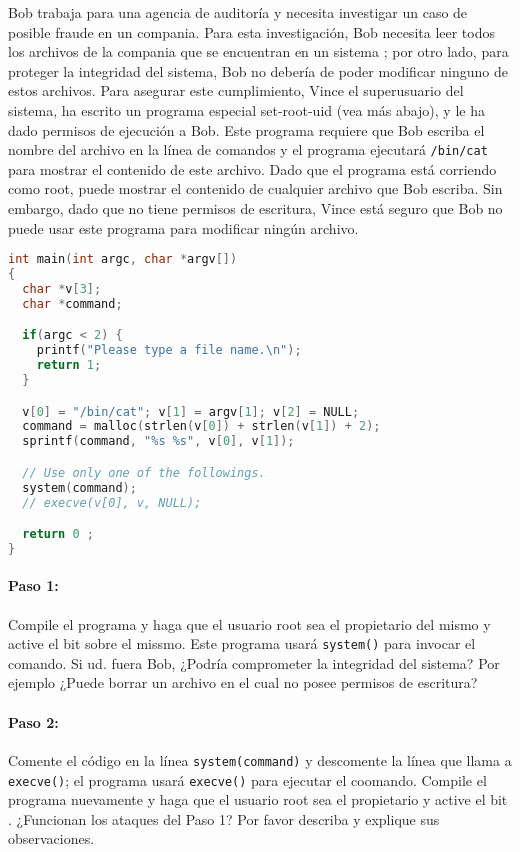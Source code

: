 Bob trabaja para una agencia de auditoría y necesita investigar un caso de posible fraude en un compania. Para esta investigación, Bob necesita leer todos los archivos de la compania que se encuentran en un sistema \unix; por otro lado, para proteger la integridad del sistema, Bob no debería de poder modificar ninguno de estos archivos.
Para asegurar este cumplimiento, Vince el superusuario del sistema, ha escrito un programa especial set-root-uid (vea más abajo), y le ha dado permisos de ejecución a Bob. Este programa requiere que Bob escriba el nombre del archivo en la línea de comandos y el programa ejecutará {\tt /bin/cat} para mostrar el contenido de este archivo. Dado que el programa está corriendo como root, puede mostrar el contenido de cualquier archivo que Bob escriba. Sin embargo, dado que no tiene permisos de escritura, Vince está seguro que Bob no puede usar este programa para modificar ningún archivo.


\begin{lstlisting}[language=C, caption=\texttt{catall.c}]
int main(int argc, char *argv[])
{
  char *v[3];
  char *command;

  if(argc < 2) {
    printf("Please type a file name.\n");
    return 1;
  }

  v[0] = "/bin/cat"; v[1] = argv[1]; v[2] = NULL;
  command = malloc(strlen(v[0]) + strlen(v[1]) + 2);
  sprintf(command, "%s %s", v[0], v[1]);

  // Use only one of the followings.
  system(command);
  // execve(v[0], v, NULL);

  return 0 ;
}
\end{lstlisting}


\paragraph{Paso 1:} Compile el programa y haga que el usuario root sea el propietario del mismo y active el bit \setuid sobre el missmo. Este programa usará {\tt system()} para invocar el comando. Si ud. fuera Bob, ¿Podría comprometer la integridad del sistema? Por ejemplo ¿Puede borrar un archivo en el cual no posee permisos de escritura?

\paragraph{Paso 2:} Comente el código en la línea {\tt system(command)} y descomente la línea que llama a {\tt execve()}; el programa usará {\tt execve()} para ejecutar el coomando. Compile el programa nuevamente y haga que el usuario root sea el propietario y active el bit \setuid.
¿Funcionan los ataques del Paso 1? Por favor describa y explique sus observaciones.



